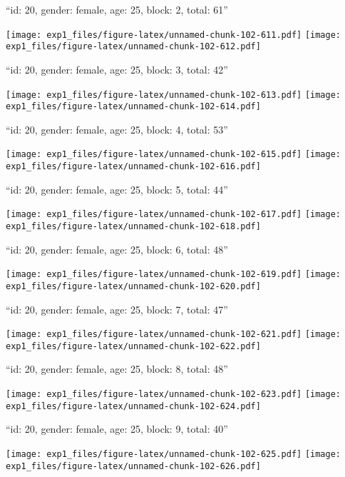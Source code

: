\documentclass[11pt,,]{article}
\begin{document}
\newpage
[1] 

``id: 20, gender: female, age: 25, block: 2, total: 61''

\texttt{[image: exp1\_files/figure-latex/unnamed-chunk-102-611.pdf]}
\texttt{[image: exp1\_files/figure-latex/unnamed-chunk-102-612.pdf]}

\newpage
[1] 

``id: 20, gender: female, age: 25, block: 3, total: 42''

\texttt{[image: exp1\_files/figure-latex/unnamed-chunk-102-613.pdf]}
\texttt{[image: exp1\_files/figure-latex/unnamed-chunk-102-614.pdf]}

\newpage
[1] 

``id: 20, gender: female, age: 25, block: 4, total: 53''

\texttt{[image: exp1\_files/figure-latex/unnamed-chunk-102-615.pdf]}
\texttt{[image: exp1\_files/figure-latex/unnamed-chunk-102-616.pdf]}

\newpage
[1] 

``id: 20, gender: female, age: 25, block: 5, total: 44''

\texttt{[image: exp1\_files/figure-latex/unnamed-chunk-102-617.pdf]}
\texttt{[image: exp1\_files/figure-latex/unnamed-chunk-102-618.pdf]}

\newpage
[1] 

``id: 20, gender: female, age: 25, block: 6, total: 48''

\texttt{[image: exp1\_files/figure-latex/unnamed-chunk-102-619.pdf]}
\texttt{[image: exp1\_files/figure-latex/unnamed-chunk-102-620.pdf]}

\newpage
[1] 

``id: 20, gender: female, age: 25, block: 7, total: 47''

\texttt{[image: exp1\_files/figure-latex/unnamed-chunk-102-621.pdf]}
\texttt{[image: exp1\_files/figure-latex/unnamed-chunk-102-622.pdf]}

\newpage
[1] 

``id: 20, gender: female, age: 25, block: 8, total: 48''

\texttt{[image: exp1\_files/figure-latex/unnamed-chunk-102-623.pdf]}
\texttt{[image: exp1\_files/figure-latex/unnamed-chunk-102-624.pdf]}

\newpage
[1] 

``id: 20, gender: female, age: 25, block: 9, total: 40''

\texttt{[image: exp1\_files/figure-latex/unnamed-chunk-102-625.pdf]}
\texttt{[image: exp1\_files/figure-latex/unnamed-chunk-102-626.pdf]}
\end{document}
